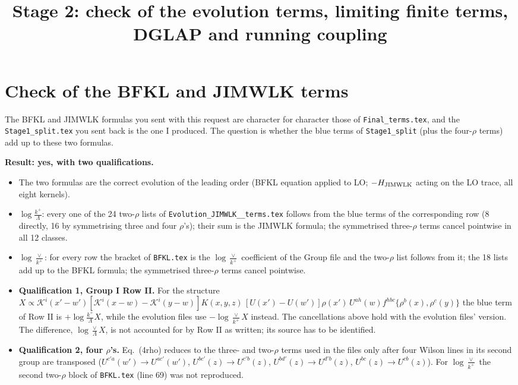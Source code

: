 \documentclass[9pt]{article}
\title{Stage 2: check of the evolution terms, limiting finite terms, DGLAP and running coupling}
\author{}
\date{}
\numberwithin{equation}{section}
\begin{document}
\maketitle
\section{Check of the BFKL and JIMWLK terms}
The BFKL and JIMWLK formulas you sent with this request are character for character those of \texttt{Final\_terms.tex}, and the \texttt{Stage1\_split.tex} you sent back is the one I produced. The question is whether the blue terms of \texttt{Stage1\_split} (plus the four-$\rho$ terms) add up to these two formulas.

\textbf{Result: yes, with two qualifications.}
\begin{itemize}
\item The two formulas are the correct evolution of the leading order (BFKL equation applied to LO; $-H_{\rm JIMWLK}$ acting on the LO trace, all eight kernels).
\item $\log\frac{k^{+}}{\Lambda}$: every one of the 24 two-$\rho$ lists of \texttt{Evolution\_JIMWLK\_\_terms.tex} follows from the blue terms of the corresponding row (8 directly, 16 by symmetrising three and four $\rho$'s); their sum is the JIMWLK formula; the symmetrised three-$\rho$ terms cancel pointwise in all 12 classes.
\item $\log\frac{\vee}{k^{+}}$: for every row the bracket of \texttt{BFKL.tex} is the $\log\frac{\vee}{k^{+}}$ coefficient of the Group file and the two-$\rho$ list follows from it; the 18 lists add up to the BFKL formula; the symmetrised three-$\rho$ terms cancel pointwise.
\item \textbf{Qualification 1, Group I Row II.} For the structure
$X\propto\mathcal{K}^{i}(x'-w')[\mathcal{K}^{i}(x-w)-\mathcal{K}^{i}(y-w)]K(x,y,z)\,[U(x')-U(w')]\rho(x')\,U^{ah}(w)f^{hbc}\{\rho^{b}(x),\rho^{c}(y)\}$
the blue term of Row II is $+\log\frac{k^{+}}{\Lambda}X$, while the evolution files use $-\log\frac{\vee}{k^{+}}X$ instead. The cancellations above hold with the evolution files' version. The difference, $\log\frac{\vee}{\Lambda}X$, is not accounted for by Row II as written; its source has to be identified.
\item \textbf{Qualification 2, four $\rho$'s.} Eq.~(4rho) reduces to the three- and two-$\rho$ terms used in the files only after four Wilson lines in its second group are transposed ($U^{c'a}(w')\to U^{ac'}(w')$, $U^{bc'}(z)\to U^{c'b}(z)$, $U^{bd'}(z)\to U^{d'b}(z)$, $U^{bc}(z)\to U^{cb}(z)$). For $\log\frac{\vee}{k^{+}}$ the second two-$\rho$ block of \texttt{BFKL.tex} (line 69) was not reproduced.
\end{itemize}
\end{document}
